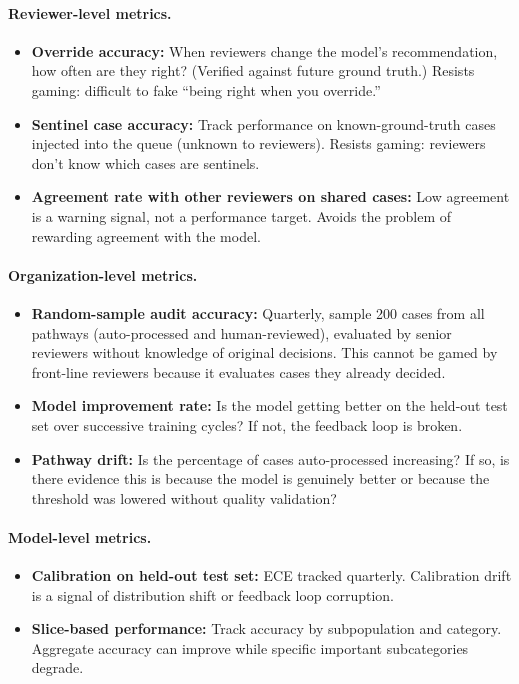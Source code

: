 \paragraph{Reviewer-level metrics.}

\begin{itemize}
    \item \textbf{Override accuracy:} When reviewers change the model's recommendation, how often are they right? (Verified against future ground truth.) Resists gaming: difficult to fake ``being right when you override.''
    \item \textbf{Sentinel case accuracy:} Track performance on known-ground-truth cases injected into the queue (unknown to reviewers). Resists gaming: reviewers don't know which cases are sentinels.
    \item \textbf{Agreement rate with other reviewers on shared cases:} Low agreement is a warning signal, not a performance target. Avoids the problem of rewarding agreement with the model.
\end{itemize}

\paragraph{Organization-level metrics.}

\begin{itemize}
    \item \textbf{Random-sample audit accuracy:} Quarterly, sample 200 cases from all pathways (auto-processed and human-reviewed), evaluated by senior reviewers without knowledge of original decisions. This cannot be gamed by front-line reviewers because it evaluates cases they already decided.
    \item \textbf{Model improvement rate:} Is the model getting better on the held-out test set over successive training cycles? If not, the feedback loop is broken.
    \item \textbf{Pathway drift:} Is the percentage of cases auto-processed increasing? If so, is there evidence this is because the model is genuinely better or because the threshold was lowered without quality validation?
\end{itemize}

\paragraph{Model-level metrics.}

\begin{itemize}
    \item \textbf{Calibration on held-out test set:} ECE tracked quarterly. Calibration drift is a signal of distribution shift or feedback loop corruption.
    \item \textbf{Slice-based performance:} Track accuracy by subpopulation and category. Aggregate accuracy can improve while specific important subcategories degrade.
\end{itemize}

